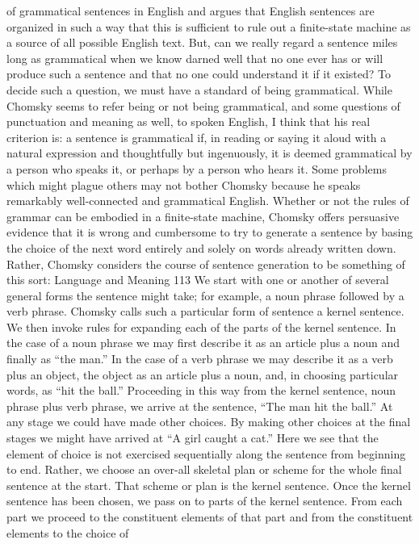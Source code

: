 {{{of grammatical sentences in English and argues that English sentences
are organized in such a way that this is sufficient to rule
out a finite-state machine as a source of all possible English text.
But, can we really regard a sentence miles long as grammatical
when we know darned well that no one ever has or will produce
such a sentence and that no one could understand it if it existed?
To decide such a question, we must have a standard of being
grammatical. While Chomsky seems to refer being or not being
grammatical, and some questions of punctuation and meaning as
well, to spoken English, I think that his real criterion is: a sentence
is grammatical if, in reading or saying it aloud with a natural
expression and thoughtfully but ingenuously, it is deemed grammatical
by a person who speaks it, or perhaps by a person who
hears it. Some problems which might plague others may not bother
Chomsky because he speaks remarkably well-connected and grammatical
English.
Whether or not the rules of grammar can be embodied in a
finite-state machine, Chomsky offers persuasive evidence that it is
wrong and cumbersome to try to generate a sentence by basing
the choice of the next word entirely and solely on words already
written down. Rather, Chomsky considers the course of sentence
generation to be something of this sort:
Language and Meaning 113
We start with one or another of several general forms the sentence
might take; for example, a noun phrase followed by a verb
phrase. Chomsky calls such a particular form of sentence a kernel
sentence. We then invoke rules for expanding each of the parts of
the kernel sentence. In the case of a noun phrase we may first describe
it as an article plus a noun and finally as “the man.” In the
case of a verb phrase we may describe it as a verb plus an object,
the object as an article plus a noun, and, in choosing particular
words, as “hit the ball.” Proceeding in this way from the kernel
sentence, noun phrase plus verb phrase, we arrive at the sentence,
“The man hit the ball.” At any stage we could have made other
choices. By making other choices at the final stages we might have
arrived at “A girl caught a cat.”
Here we see that the element of choice is not exercised sequentially
along the sentence from beginning to end. Rather, we choose
an over-all skeletal plan or scheme for the whole final sentence at
the start. That scheme or plan is the kernel sentence. Once the
kernel sentence has been chosen, we pass on to parts of the kernel
sentence. From each part we proceed to the constituent elements
of that part and from the constituent elements to the choice of
}}}
